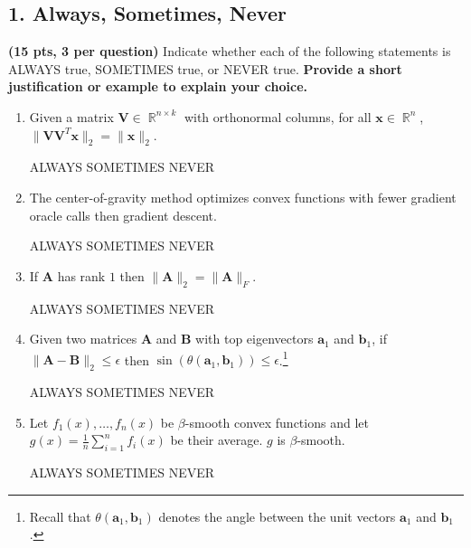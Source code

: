 \documentclass[10pt]{article}
\newcommand{\bv}[1]{\mathbf{#1}}
\DeclareMathOperator{\R}{\mathbb{R}}
\begin{document}
\subsection{1. Always, Sometimes, Never}
\textbf{(15 pts, 3 per question)} Indicate whether each of the following statements is ALWAYS true, SOMETIMES true, or NEVER true. \textbf{Provide a short justification or example to explain your choice.} 
\begin{enumerate}[label=(\alph*)]		
		\item Given a matrix $\bv{V} \in \R^{n\times k}$ with orthonormal columns, for all $\bv{x} \in \R^n$, $\|\bv{VV}^T\bv{x}\|_2 = \|\bv{x}\|_2$.
		
		ALWAYS\hspace{1em} SOMETIMES\hspace{1em} NEVER\vspace{5em}
		
		\item The center-of-gravity method optimizes convex functions with fewer gradient oracle calls then gradient descent. 
		
		ALWAYS\hspace{1em} SOMETIMES\hspace{1em} NEVER\vspace{5em}
		
		\item If $\bv{A}$ has rank $1$ then $\|\bv{A}\|_2 = \|\bv{A}\|_F$.  
		
		ALWAYS\hspace{1em} SOMETIMES\hspace{1em} NEVER\vspace{5em}
		
		\item Given two matrices $\bv{A}$ and $\bv{B}$ with top eigenvectors $\bv{a}_1$ and $\bv{b}_1$, if $\|\bv{A} - \bv{B}\|_2 \leq \epsilon$ then $\sin(\theta(\bv{a}_1,\bv{b}_1)) \leq \epsilon$.\footnote{Recall that $\theta(\bv{a}_1,\bv{b}_1)$ denotes the angle between the unit vectors $\bv{a}_1$ and $\bv{b}_1$.}
	
		
		ALWAYS\hspace{1em} SOMETIMES\hspace{1em} NEVER\vspace{5em}
	
		\item Let $f_1(x), \ldots, f_n(x)$ be $\beta$-smooth convex functions and let $g(x) = \frac{1}{n}\sum_{i=1}^n f_i(x)$ be their average. $g$ is $\beta$-smooth.
		
		ALWAYS\hspace{1em} SOMETIMES\hspace{1em} NEVER\vspace{5em}
\end{enumerate}
\end{document}

